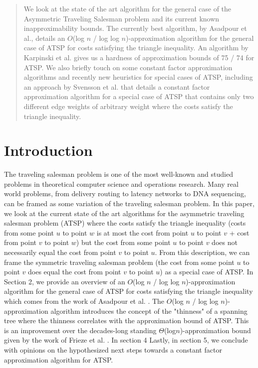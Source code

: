 \documentclass[oneside]{projectpaper} %
\begin{document}
\maketitle
\begin{abstract}
We look at the state of the art algorithm for the general case of the Asymmetric Traveling Salesman problem and its current known inapproximability bounds. The currently best algorithm, by Asadpour et al.\cite{AGM10}, details an $O$(log $n$ / log log $n$)-approximation algorithm for the general case of ATSP for costs satisfying the triangle inequality. An algorithm by Karpinski et al.\cite{KLS15} gives us a hardness of approximation bounds of 75 / 74 for ATSP. We also briefly touch on some constant factor approximation algorithms and recently new heuristics for special cases of ATSP, including an approach by Svensson et al.\cite{STV16} that details a constant factor approximation algorithm for a special case of ATSP that contains only two different edge weights of arbitrary weight where the costs satisfy the triangle inequality.
\end{abstract}
\section{Introduction}
The traveling salesman problem is one of the most well-known and studied problems in theoretical computer science and operations research. Many real world problems, from delivery routing to latency networks to DNA sequencing, can be framed as some variation of the traveling salesman problem. In this paper, we look at the current state of the art algorithms for the asymmetric traveling salesman problem (ATSP) where the costs satisfy the triangle inequality (costs from some point $u$ to point $w$ is at most the cost from point $u$ to point $v$ + cost from point $v$ to point $w$) but the cost from some point $u$ to point $v$ does not necessarily equal the cost from point $v$ to point $u$. From this description, we can frame the symmetric traveling salesman problem (the cost from some point $u$ to point $v$ does equal the cost from point $v$ to point $u$) as a special case of ATSP. \newline
\indent In Section 2, we provide an overview of an $O$(log $n$ / log log $n$)-approximation algorithm for the general case of ATSP for costs satisfying the triangle inequality which comes from the work of Asadpour et al. \cite{AGM10}. The $O$(log $n$ / log log $n$)-approximation algorithm introduces the concept of the "thinness" of a spanning tree where the thinness correlates with the approximation bound of ATSP. This is an improvement over the decades-long standing $\Theta$(log$n$)-approximation bound given by the work of Frieze et al. \cite{FGM83}. \newline
\indent In section 4 \newline
\indent Lastly, in section 5, we conclude with opinions on the hypothesized next steps towards a constant factor approximation algorithm for ATSP.
\end{document}

